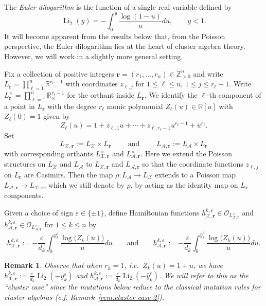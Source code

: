 \documentclass{amsart}
\newtheorem{remark}[theorem]{Remark}
\numberwithin{equation}{section}
\newcommand{\bfr}{{\boldsymbol{r}}}
\newcommand{\cA}{\mathcal{A}}
\newcommand{\cO}{\mathcal{O}}
\newcommand{\cX}{\mathcal{X}}
\newcommand{\RR}{\mathbb{R}}
\newcommand{\ZZ}{\mathbb{Z}}
\newcommand{\Li}{\operatorname{Li}}
\begin{document}
The \emph{Euler dilogarithm} is the function of a single real variable defined by
\[\Li_2(y)=-\int_0^y \frac{\log(1-u)}{u}du,\qquad y<1.\]
It will become apparent from the results below that, from the Poisson perspective, the Euler dilogarithm lies at the heart of cluster algebra theory.
However, we will work in a slightly more general setting.

Fix a collection of positive integers $\bfr=(r_1,\ldots,r_n)\in\ZZ_{>0}^n$ and write $L_\bfr=\prod_{\ell=1}^n \RR^{r_\ell-1}$ with coordinates $z_{\ell,j}$ for $1\le\ell\le n$, $1\le j\le r_\ell-1$.
Write $L^\times_\bfr=\prod_{\ell=1}^n \RR_\times^{r_\ell-1}$ for the orthant inside $L_\bfr$.
We identify the $\ell$-th component of a point in $L_\bfr$ with the degree $r_\ell$ monic polynomial $Z_\ell(u)\in\RR[u]$ with $Z_\ell(0)=1$ given by
\[Z_\ell(u)=1+z_{\ell,1}u+\cdots+z_{\ell,r_\ell-1}u^{r_\ell-1}+u^{r_\ell}.\]
Set 
\[L_{\cX,\bfr}:=L_\cX\times L_\bfr\qquad\text{ and }\qquad L_{\cA,\bfr}:=L_\cA\times L_\bfr\]
with corresponding orthants $L^\times_{\cX,\bfr}$ and $L^\times_{\cA,\bfr}$.
Here we extend the Poisson structures on $L_\cX$ and $L_\cA$ to $L_{\cX,\bfr}$ and $L_{\cA,\bfr}$ so that the coordinate functions $z_{\ell,j}$ on $L_\bfr$ are Casimirs. 
Then the map $\rho:L_\cA\to L_\cX$ extends to a Poisson map $L_{\cA,\bfr}\to L_{\cX,\bfr}$, which we still denote by $\rho$, by acting as the identity map on $L_\bfr$ components.

Given a choice of sign $\varepsilon\in\{\pm1\}$, define Hamiltonian functions $h^{k,\varepsilon}_{\cX,\bfr}\in\cO_{L^\times_{\cX,\bfr}}$ and $h^{k,\varepsilon}_{\cA,\bfr}\in\cO_{L^\times_{\cA,\bfr}}$ for $1\le k\le n$ by
\begin{equation}
  \label{eq:hamiltonians}
  h_{\cX,\bfr}^{k,\varepsilon}:=-\frac{\varepsilon}{d_k}\int_0^{y_k^\varepsilon} \frac{\log\big(Z_k(u)\big)}{u}du\qquad\text{and}\qquad h_{\cA,\bfr}^{k,\varepsilon}:=-\frac{\varepsilon}{d_k}\int_0^{\hat y_k^\varepsilon} \frac{\log\big(Z_k(u)\big)}{u}du.
\end{equation}
\begin{remark}
  \label{rem:cluster case}
  Observe that when $r_k=1$, i.e.\ $Z_k(u)=1+u$, we have $h_{\cX,\bfr}^{k,\varepsilon}:=\frac{\varepsilon}{d_k}\Li_2(-y_k^\varepsilon)$ and $h_{\cA,\bfr}^{k,\varepsilon}:=\frac{\varepsilon}{d_k}\Li_2(-\hat y_k^\varepsilon)$.
  We will refer to this as the ``cluster case'' since the mutations below reduce to the classical mutation rules for cluster algebras (c.f. Remark~\ref{rem:cluster case 2}).
\end{remark}
\end{document}
